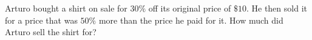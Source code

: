 Arturo bought a shirt on sale for $30\%$ off its original price of $\$10$. He then sold it for a price that was $50\%$ more than the price he paid for it. How much did Arturo sell the shirt for?
